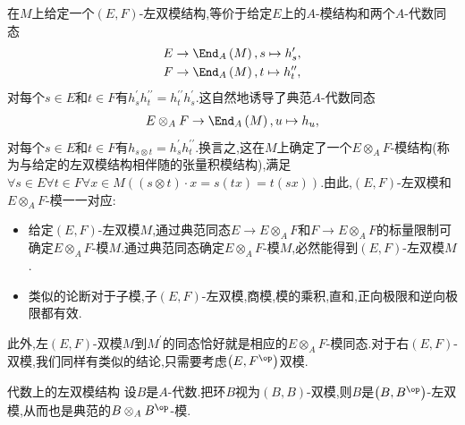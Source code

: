\begin{remark}{}{}
	在$M$上给定一个$\left(E,F\right)$-左双模结构,等价于给定$E$上的$A$-模结构和两个$A$-代数同态
	\begin{gather*}
		E\to\End_{A}\left(M\right),s\mapsto h_{s}^{\prime},\\
		F\to\End_{A}\left(M\right),t\mapsto h_{t}^{\prime\prime},
	\end{gather*}
	对每个$s\in E$和$t\in F$有$h_{s}^{\prime}h_{t}^{\prime\prime}=h_{t}^{\prime\prime}h_{s}^{\prime}$.这自然地诱导了典范$A$-代数同态
	\begin{align*}
		E\otimes_{A}F\to\End_{A}\left(M\right),u\mapsto h_{u},
	\end{align*}
	对每个$s\in E$和$t\in F$有$h_{s\otimes t}=h_{s}^{\prime}h_{t}^{\prime\prime}$.换言之,这在$M$上确定了一个$E\otimes_{A}F$-模结构(称为与给定的左双模结构相伴随的张量积模结构),满足$\forall s\in E\forall t\in F\forall x\in M\left(\left(s\otimes t\right)\cdot x=s\left(tx\right)=t\left(sx\right)\right)$.由此,$\left(E,F\right)$-左双模和$E\otimes_{A}F$-模一一对应:
	\begin{itemize}
		\item 给定$\left(E,F\right)$-左双模$M$,通过典范同态$E\to E\otimes_{A}F$和$F\to E\otimes_{A}F$的标量限制可确定$E\otimes_{A}F$-模$M$.通过典范同态确定$E\otimes_{A}F$-模$M$,必然能得到$\left(E,F\right)$-左双模$M$.
		\item 类似的论断对于子模,子$\left(E,F\right)$-左双模,商模,模的乘积,直和,正向极限和逆向极限都有效.
	\end{itemize}
		此外,左$\left(E,F\right)$-双模$M$到$M^{\prime}$的同态恰好就是相应的$E\otimes_{A}F$-模同态.对于右$\left(E,F\right)$-双模,我们同样有类似的结论,只需要考虑$\left(E,F^{\op}\right)$双模.
\end{remark}

\begin{example}{代数上的左双模结构}{}
	设$B$是$A$-代数.把环$B$视为$\left(B,B\right)$-双模,则$B$是$\left(B,B^{\op}\right)$-左双模,从而也是典范的$B\otimes_{A}B^{\op}$-模.
\end{example}

